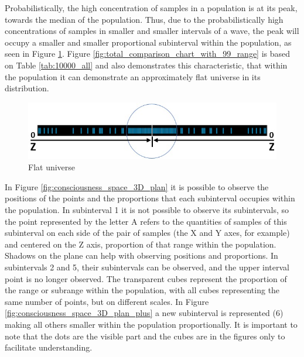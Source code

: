Probabilistically, the high concentration of samples in a population is at its peak, towards the median of the population. Thus, due to the probabilistically high concentrations of samples in smaller and smaller intervals of a wave, the peak will occupy a smaller and smaller proportional subinterval within the population, as seen in Figure \ref{fig:consciousness_flat_universe}. Figure \ref{fig:total_comparison_chart_with_99_range} is based on Table \ref{tab:10000_all} and also demonstrates this characteristic, that within the population it can demonstrate an approximately flat universe in its distribution.  
	\begin{figure}[H]
	\caption{Flat universe}
	\label{fig:consciousness_flat_universe}
	\centering
	\includegraphics[scale=.4]{sections/images/consciousness_flat_universe.jpg}
	\end{figure}

In Figure \ref{fig:consciousness_space_3D_plan} it is possible to observe the positions of the points and the proportions that each subinterval occupies within the population. In subinterval 1 it is not possible to observe its subintervals, so the point represented by the letter A refers to the quantities of samples of this subinterval on each side of the pair of samples (the X and Y axes, for example) and centered on the Z axis, proportion of that range within the population. Shadows on the plane can help with observing positions and proportions. In subintervals 2 and 5, their subintervals can be observed, and the upper interval point is no longer observed. The transparent cubes represent the proportion of the range or subrange within the population, with all cubes representing the same number of points, but on different scales. In Figure \ref{fig:consciousness_space_3D_plan_plus} a new subinterval is represented (6) making all others smaller within the population proportionally. It is important to note that the dots are the visible part and the cubes are in the figures only to facilitate understanding.

